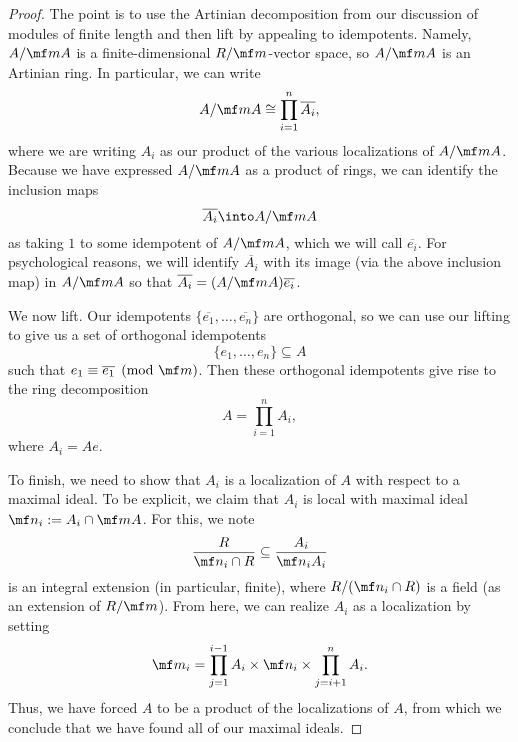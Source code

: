 \documentclass[../notes.tex]{subfiles}
\begin{document}
\begin{proof}
	The point is to use the Artinian decomposition from our discussion of modules of finite length and then lift by appealing to idempotents. Namely, $A/\mf mA$ is a finite-dimensional $R/\mf m$-vector space, so $A/\mf mA$ is an Artinian ring. In particular, we can write
	\[A/\mf mA\cong\prod_{i=1}^n\overline{A_i},\]
	where we are writing $A_i$ as our product of the various localizations of $A/\mf mA$. Because we have expressed $A/\mf mA$ as a product of rings, we can identify the inclusion maps
	\[\overline{A_i}\into A/\mf mA\]
	as taking $1$ to some idempotent of $A/\mf mA$, which we will call $\overline{e_i}$. For psychological reasons, we will identify $\overline{A_i}$ with its image (via the above inclusion map) in $A/\mf mA$ so that $\overline{A_i}=(A/\mf mA)\overline{e_i}$. %

	We now lift. Our idempotents $\{\overline{e_1},\ldots,\overline{e_n}\}$ are orthogonal, so we can use our lifting to give us a set of orthogonal idempotents
	\[\{e_1,\ldots,e_n\}\subseteq A\]
	such that $e_1\equiv\overline{e_1}\pmod{\mf m}$. Then these orthogonal idempotents give rise to the ring decomposition
	\[A=\prod_{i=1}^nA_i,\]
	where $A_i=Ae$.

	To finish, we need to show that $A_i$ is a localization of $A$ with respect to a maximal ideal. To be explicit, we claim that $A_i$ is local with maximal ideal $\mf n_i:=A_i\cap\mf mA$. For this, we note
	\[\frac{R}{\mf n_i\cap R}\subseteq\frac{A_i}{\mf n_iA_i}\]
	is an integral extension (in particular, finite), where $R/(\mf n_i\cap R)$ is a field (as an extension of $R/\mf m$). From here, we can realize $A_i$ as a localization by setting
	\[\mf m_i=\prod_{j=1}^{i-1}A_i\times\mf n_i\times\prod_{j=i+1}^nA_i.\]
	Thus, we have forced $A$ to be a product of the localizations of $A$, from which we conclude that we have found all of our maximal ideals.
\end{proof}
\end{document}

